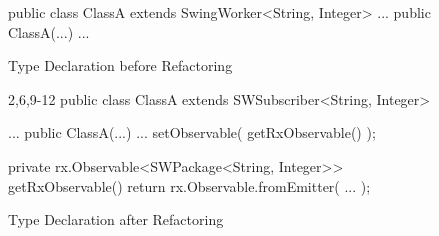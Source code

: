 \begin{figure}[H]
\begin{minipage}{0.48\textwidth}
\begin{sourcecode}
\begin{javacode}{2}
public class ClassA 
	extends SwingWorker<String, Integer> {
	...
	public ClassA(...) {
		...	
	}
}
\end{javacode}
\caption{Type Declaration before Refactoring}
\label{code:td-before}
\end{sourcecode}
\end{minipage}\hspace{0.7cm}
\begin{minipage}{0.48\textwidth}
\begin{sourcecode}
\begin{javacode}{2,6,9-12}
public class ClassA 
	extends SWSubscriber<String, Integer> {
	...
	public ClassA(...) {
		...
		setObservable( getRxObservable() );
	}
	
	private rx.Observable<SWPackage<String, Integer>> 
		getRxObservable() {
			return rx.Observable.fromEmitter( ... );
	}
}
\end{javacode}
\caption{Type Declaration after Refactoring}
\label{code:td-after}
\end{sourcecode}
\end{minipage}
\end{figure}